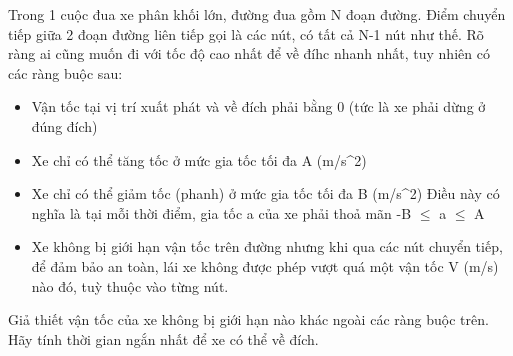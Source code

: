 Trong 1 cuộc đua xe phân khối lớn, đường đua gồm N đoạn đường. Điểm chuyển tiếp giữa 2 đoạn đường liên tiếp gọi là các nút, có tất cả N-1 nút như thế. Rõ ràng ai cũng muốn đi với tốc độ cao nhất để về đíhc nhanh nhất, tuy nhiên có các ràng buộc sau:
\begin{itemize}
	\item Vận tốc tại vị trí xuất phát và về đích phải bằng 0 (tức là xe phải dừng ở đúng đích)
	\item Xe chỉ có thể tăng tốc ở mức gia tốc tối đa A (m/s^2)
	\item Xe chỉ có thể giảm tốc (phanh) ở mức gia tốc tối đa B (m/s^2) Điều này có nghĩa là tại mỗi thời điểm, gia tốc a của xe phải thoả mãn -B $\le$ a $\le$ A
	\item Xe không bị giới hạn vận tốc trên đường nhưng khi qua các nút chuyển tiếp, để đảm bảo an toàn, lái xe không được phép vượt quá một vận tốc V (m/s) nào đó, tuỳ thuộc vào từng nút.
\end{itemize}

Giả thiết vận tốc của xe không bị giới hạn nào khác ngoài các ràng buộc trên. Hãy tính thời gian ngắn nhất để xe có thể về đích.